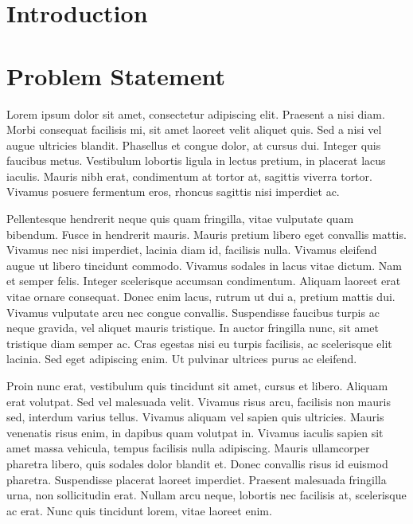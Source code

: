 \documentclass[titlepage,a4paper,12pt,thmsb]{report}
\begin{document}



\newpage
{}
\newpage

\chapter{Introduction}

\chapter{Problem Statement}

Lorem ipsum dolor sit amet, consectetur adipiscing elit. Praesent a nisi diam. Morbi consequat facilisis mi, sit amet laoreet velit aliquet quis. Sed a nisi vel augue ultricies blandit. Phasellus et congue dolor, at cursus dui. Integer quis faucibus metus. Vestibulum lobortis ligula in lectus pretium, in placerat lacus iaculis. Mauris nibh erat, condimentum at tortor at, sagittis viverra tortor. Vivamus posuere fermentum eros, rhoncus sagittis nisi imperdiet ac.

Pellentesque hendrerit neque quis quam fringilla, vitae vulputate quam bibendum. Fusce in hendrerit mauris. Mauris pretium libero eget convallis mattis. Vivamus nec nisi imperdiet, lacinia diam id, facilisis nulla. Vivamus eleifend augue ut libero tincidunt commodo. Vivamus sodales in lacus vitae dictum. Nam et semper felis. Integer scelerisque accumsan condimentum. Aliquam laoreet erat vitae ornare consequat. Donec enim lacus, rutrum ut dui a, pretium mattis dui. Vivamus vulputate arcu nec congue convallis. Suspendisse faucibus turpis ac neque gravida, vel aliquet mauris tristique. In auctor fringilla nunc, sit amet tristique diam semper ac. Cras egestas nisi eu turpis facilisis, ac scelerisque elit lacinia. Sed eget adipiscing enim. Ut pulvinar ultrices purus ac eleifend.

Proin nunc erat, vestibulum quis tincidunt sit amet, cursus et libero. Aliquam erat volutpat. Sed vel malesuada velit. Vivamus risus arcu, facilisis non mauris sed, interdum varius tellus. Vivamus aliquam vel sapien quis ultricies. Mauris venenatis risus enim, in dapibus quam volutpat in. Vivamus iaculis sapien sit amet massa vehicula, tempus facilisis nulla adipiscing. Mauris ullamcorper pharetra libero, quis sodales dolor blandit et. Donec convallis risus id euismod pharetra. Suspendisse placerat laoreet imperdiet. Praesent malesuada fringilla urna, non sollicitudin erat. Nullam arcu neque, lobortis nec facilisis at, scelerisque ac erat. Nunc quis tincidunt lorem, vitae laoreet enim.
\end{document}
